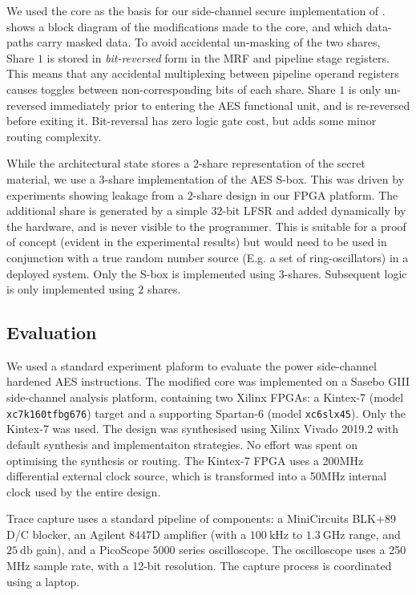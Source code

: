 We used the  core as the basis for our side-channel secure
implementation of .
 shows a block diagram of the modifications
made to the core, and which data-paths carry masked data.
To avoid accidental un-masking of the two shares,
Share $1$ is stored in {\em bit-reversed} form in the MRF and pipeline
stage registers.
This means that any accidental multiplexing between pipeline operand
registers causes toggles between non-corresponding bits of each share.
Share $1$ is only un-reversed immediately prior to entering the
AES functional unit, and is re-reversed before exiting it.
Bit-reversal has zero logic gate cost, but adds some minor routing
complexity.

While the architectural state stores a $2$-share representation
of the secret material, we use a $3$-share implementation of the
AES S-box.
This was driven by experiments showing 
leakage from a $2$-share design in our FPGA platform.
The additional share is generated by a simple $32$-bit LFSR and added
dynamically by the hardware, and is never visible to the programmer.
This is suitable for a proof of concept (evident in the experimental
results) but would need to be used in conjunction with a true random
number source (E.g. a set of ring-oscillators) in a deployed system.
Only the S-box is implemented using $3$-shares.
Subsequent  logic is only implemented using $2$ shares.

\subsection{Evaluation}

We used a standard experiment plaform to evaluate the power side-channel
hardened AES  instructions.
The modified  core was implemented on a
Sasebo GIII \cite{HKSS:12}
side-channel analysis platform, containing two Xilinx FPGAs:
a Kintex-7 
(model {\tt xc7k160tfbg676})
target
and
a supporting Spartan-6
(model {\tt xc6slx45}).
Only the Kintex-7 was used.
The design was synthesised using Xilinx Vivado 2019.2 with
default synthesis and implementaiton strategies.
No effort was spent on optimising the synthesis or routing.
The Kintex-7 FPGA uses a 200MHz differential external clock source, which is
transformed into a 50MHz internal clock used by the entire
design.

Trace capture uses a standard pipeline of components:
a MiniCircuits BLK+89 D/C blocker,
an Agilent 8447D amplifier (with a $\SI{100}{\kilo\hertz}$ to $\SI{1.3}{\giga\hertz}$ range, and $\SI{25}{\decibel}$ gain),
and
a  PicoScope 5000 series oscilloscope.
The oscilloscope uses a 250 MHz sample rate, with a 12-bit resolution.
The capture process is coordinated using a laptop.

